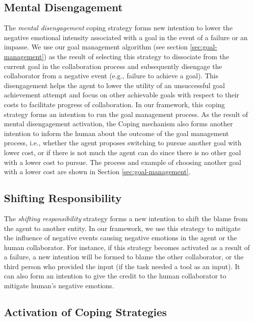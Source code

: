 \documentclass[12pt]{report}
\begin{document}
\subsection{Mental Disengagement}
The \textit{mental disengagement} coping strategy forms new intention to lower
the negative emotional intensity associated with a goal in the event of a
failure or an impasse. We use our goal management algorithm (see section
\ref{sec:goal-management}) as the result of selecting this strategy to
dissociate from the current goal in the collaboration process and subsequently
disengage the collaborator from a negative event (e.g., failure to achieve a
goal). This disengagement helps the agent to lower the utility of an
unsuccessful goal achievement attempt and focus on other achievable goals with
respect to their costs to facilitate progress of collaboration. In our
framework, this coping strategy forms an intention to run the goal management
process. As the result of mental disengagement activation, the Coping mechanism
also forms another intention to inform the human about the outcome of the goal
management process, i.e., whether the agent proposes switching to pursue another
goal with lower cost, or if there is not much the agent can do since there is no
other goal with a lower cost to pursue. The process and example of choosing
another goal with a lower cost are shown in Section \ref{sec:goal-management}.

\subsection{Shifting Responsibility}
The \textit{shifting responsibility} strategy forms a new intention to shift the
blame from the agent to another entity. In our framework, we use this strategy
to mitigate the influence of negative events causing negative emotions in the
agent or the human collaborator. For instance, if this strategy becomes
activated as a result of a failure, a new intention will be formed to blame the
other collaborator, or the third person who provided the input (if the task
needed a tool as an input). It can also form an intention to give the credit to
the human collaborator to mitigate human's negative emotions.

\subsection{Activation of Coping Strategies}
\end{document}
